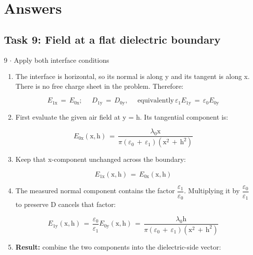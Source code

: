 \documentclass[11pt]{article}
\begin{document}
\section{Answers}
\begin{keepsection}\subsection{Task 9: Field at a flat dielectric boundary}

\begin{workedbox}{9 \ensuremath{\cdot} Apply both interface conditions}
\begin{enumerate}
\item {}
The interface is horizontal, so its normal is along y and its tangent is along x. There is no free charge sheet in the problem. Therefore:

\begin{equation*}{E}_{1\mathrm{x}}\, =\, {E}_{0\mathrm{x}};\, \quad \, {D}_{1\mathrm{y}}\, =\, {D}_{0\mathrm{y}},\, \quad \, \text{equivalently}\, {ε}_{1}{E}_{1\mathrm{y}}\, =\, {ε}_{0}{E}_{0\mathrm{y}}\end{equation*}
\item {}
First evaluate the given air field at y = h. Its tangential component is:

\begin{equation*}{E}_{0\mathrm{x}}(\mathrm{x},\mathrm{h})\, =\, \dfrac{{λ}_{0}\mathrm{x}}{π({ε}_{0}\, +\, {ε}_{1})(\mathrm{x}^{2}\, +\, \mathrm{h}^{2})}\end{equation*}
\item {}
Keep that x-component unchanged across the boundary:

\begin{equation*}{E}_{1\mathrm{x}}(\mathrm{x},\mathrm{h})\, =\, {E}_{0\mathrm{x}}(\mathrm{x},\mathrm{h})\end{equation*}
\item {}
The measured normal component contains the factor {\small\ensuremath{\dfrac{ε_{1}}{ε_{0}}}}. Multiplying it by {\small\ensuremath{\dfrac{ε_{0}}{ε_{1}}}} to preserve D cancels that factor:

\begin{equation*}{E}_{1\mathrm{y}}(\mathrm{x},\mathrm{h})\, =\, \dfrac{{ε}_{0}}{{ε}_{1}}{E}_{0\mathrm{y}}(\mathrm{x},\mathrm{h})\, =\, \dfrac{{λ}_{0}\mathrm{h}}{π({ε}_{0}\, +\, {ε}_{1})(\mathrm{x}^{2}\, +\, \mathrm{h}^{2})}\end{equation*}
\item {}
\textbf{Result:} combine the two components into the dielectric-side vector:


\end{enumerate}
\end{workedbox}
\end{keepsection}
\end{document}
